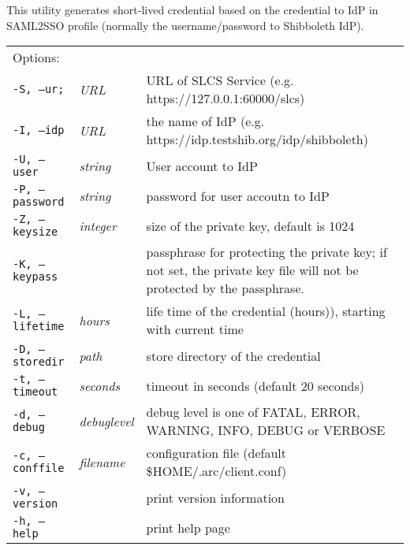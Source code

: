 This utility generates  short-lived
credential  based  on the credential to IdP in SAML2SSO profile (normally the
username/password to Shibboleth IdP).

\hspace*{0.5cm}
\begin{shaded}
\end{shaded}
\begin{longtable}{llp{8cm}}
   Options:&&\\
   \texttt{-S, --ur;}& \textit{URL} & URL of SLCS Service (e.g. https://127.0.0.1:60000/slcs)\\
   \texttt{-I, --idp}& \textit{URL} & the name of IdP (e.g. https://idp.testshib.org/idp/shibboleth)\\
   \texttt{-U, --user}& \textit{string} & User account to IdP\\
   \texttt{-P, --password}& \textit{string} & password for user accoutn to IdP\\
   \texttt{-Z, --keysize}& \textit{integer} & size of the private key, default is 1024\\
   \texttt{-K, --keypass}& \textit{} & passphrase for protecting the private key; if not set, the private key file will not be protected by the passphrase.\\
   \texttt{-L, --lifetime}& \textit{hours} & life time of the credential (hours)), starting with current time\\
   \texttt{-D, --storedir}& \textit{path} & store directory of the credential\\
   \texttt{-t, --timeout}& \textit{seconds} & timeout in seconds (default 20 seconds)\\
   \texttt{-d, --debug}& \textit{debuglevel}&debug level is one of  FATAL, ERROR, WARNING, INFO, DEBUG or VERBOSE\\
   \texttt{-c, --conffile}&\textit{filename}& configuration file (default {\$}HOME/.arc/client.conf)\\
   \texttt{-v, --version}& & print version information\\
   \texttt{-h, --help}& & print help page\\
\end{longtable}
